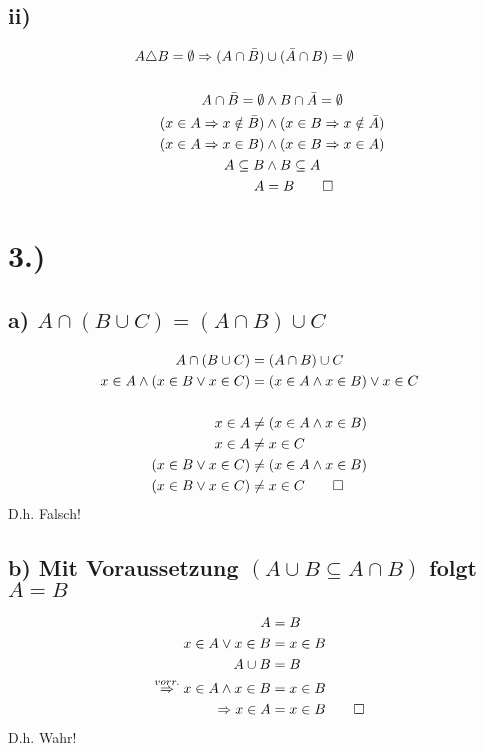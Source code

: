 \documentclass[titlepage]{article}
\begin{document}
			\subsection*{ii)}
				\begin{align*}
					A\triangle B=\emptyset\Rightarrow(A\cap \bar B)&\cup(\bar A\cap B)=\emptyset\\
					\\
					A\cap\bar B=\emptyset&\wedge B\cap\bar A=\emptyset\\
					(x\in A\Rightarrow x\notin\bar B)&\wedge(x\in B\Rightarrow x\notin\bar A)\\
					(x\in A\Rightarrow x\in B)&\wedge(x\in B\Rightarrow x\in A)\\
					A\subseteq B&\wedge B\subseteq A\\
					A&=B\qed
				\end{align*}
		\section*{3.)}
			\subsection*{a) $A\cap(B\cup C)=(A\cap B)\cup C$}
				\begin{align*}
					A\cap(B\cup C)&=(A\cap B)\cup C\\
					x\in A\wedge(x\in B\vee x\in C)&=(x\in A\wedge x\in B)\vee x\in C\\
					\\
					x\in A&\neq(x\in A\wedge x\in B)\\
					x\in A&\neq x\in C\\
					(x\in B\vee x\in C)&\neq(x\in A\wedge x\in B)\\
					(x\in B\vee x\in C)&\neq x\in C\qed
				\end{align*}
			D.h. Falsch!
			\subsection*{b) Mit Voraussetzung $(A\cup B\subseteq A\cap B)$ folgt $A=B$}
				\begin{align*}
					A&=B\\
					x\in A\vee x\in B&=x\in B\\
					A\cup B&=B\\
					\overset{vorr.}{\Rightarrow}x\in A\wedge x\in B&=x\in B\\
					\Rightarrow x\in A&=x\in B\qed
				\end{align*}
			D.h. Wahr!
\end{document}
